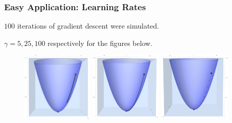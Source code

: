 \documentclass{beamer}
\begin{document}
\begin{frame}
\frametitle{Easy Application: Learning Rates}

$100$ iterations of gradient descent were simulated.

$\gamma=5,25,100$ respectively for the figures below.

\begin{figure}
\includegraphics[height=3.3cm]{learning_rate1}
\includegraphics[height=3.3cm]{learning_rate2}
\includegraphics[height=3.3cm]{learning_rate3}
\end{figure}

\end{frame}
\end{document}
